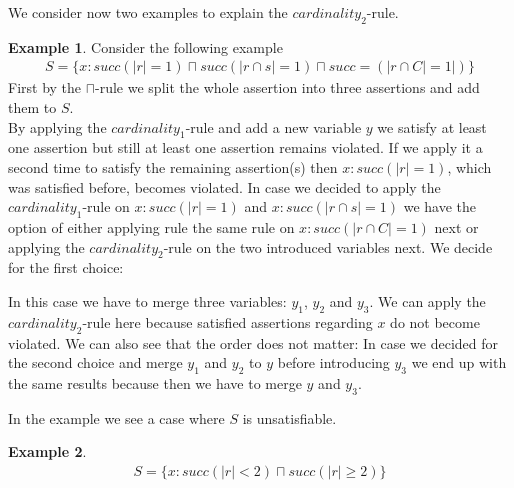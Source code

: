 \documentclass[a4paper,11pt]{scrartcl}
\theoremstyle{break}
\theoremstyle{definition}
\newtheorem{ex}{Example}
\begin{document}
We consider now two examples to explain the $cardinality_2$-rule.
\begin{ex}
Consider the following example 
\begin{align*}
S=\{x:succ(|r|=1)\sqcap succ(|r\cap s|=1)\sqcap succ=(|r\cap C|=1|)\}
\end{align*}
First by the $\sqcap$-rule we split the whole assertion into three assertions and add them to $S$.\\
By applying the $cardinality_1$-rule and add a new variable $y$ we satisfy at least one assertion but still at least one assertion remains violated. If we apply it a second time to satisfy the remaining assertion(s) then $x:succ(|r|=1)$, which was satisfied before, becomes violated. In case we decided to apply the $cardinality_1$-rule on $x:succ(|r|=1)$ and $x:succ(|r\cap s|=1)$ we have the option of either applying rule the same rule on $x:succ(|r\cap C|=1)$ next or applying the $cardinality_2$-rule on the two introduced variables next. We decide for the first choice:
\begin{figure}[H]
\centering
{}
\end{figure}
In this case we have to merge three variables: $y_1$, $y_2$ and $y_3$. We can apply the $cardinality_2$-rule here because satisfied assertions regarding $x$ do not become violated. We can also see that the order does not matter: In case we decided for the second choice and merge $y_1$ and $y_2$ to $y$ before introducing $y_3$ we end up with the same results because then we have to merge $y$ and $y_3$.
\begin{figure}[H]
\centering
{}
\end{figure}
\end{ex}
In the example we see a case where $S$ is unsatisfiable.
\begin{ex}
\begin{align*}
S=\{x:succ(|r|<2)\sqcap succ(|r|\geq 2)\}	
\end{align*}
\end{ex}
\end{document}
